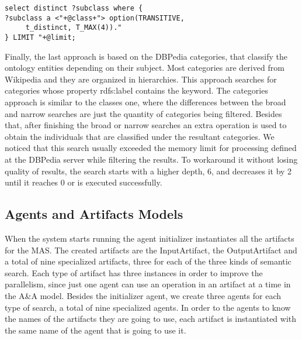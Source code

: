 \documentclass[a4paper,twoside]{article}
\begin{document}
\begin{small}
\begin{verbatim}
select distinct ?subclass where {
?subclass a <"+@class+"> option(TRANSITIVE,
     t_distinct, T_MAX(4))."
} LIMIT "+@limit;
\end{verbatim}
\end{small}

Finally, the last approach is based on the DBPedia categories, that classify the ontology entities depending on their subject. Most categories are derived from Wikipedia and they are organized in hierarchies. This approach searches for categories whose property rdfs:label contains the keyword. The categories approach is similar to the classes one, where the differences between the broad and narrow searches are just the quantity of categories being filtered. Besides that, after finishing the broad or narrow searches an extra operation is used to obtain the individuals that are classified under the resultant categories. We noticed that this search usually exceeded the memory limit for processing defined at the DBPedia server while filtering the results. To workaround it without losing quality of results, the search starts with a higher depth, 6, and decreases it by 2 until it reaches 0 or is executed successfully.


\subsection{Agents and Artifacts Models}

\noindent When the system starts running the agent initializer instantiates all the artifacts for the MAS. The created artifacts are the InputArtifact, the OutputArtifact and a total of nine specialized artifacts, three for each of the three kinds of semantic search. Each type of artifact has three instances in order to improve the parallelism, since just one agent can use an operation in an artifact at a time in the A\&A model. Besides the initializer agent, we create three agents for each type of search, a total of nine specialized agents. In order to the agents to know the names of the artifacts they are going to use, each artifact is instantiated with the same name of the agent that is going to use it.
\end{document}
